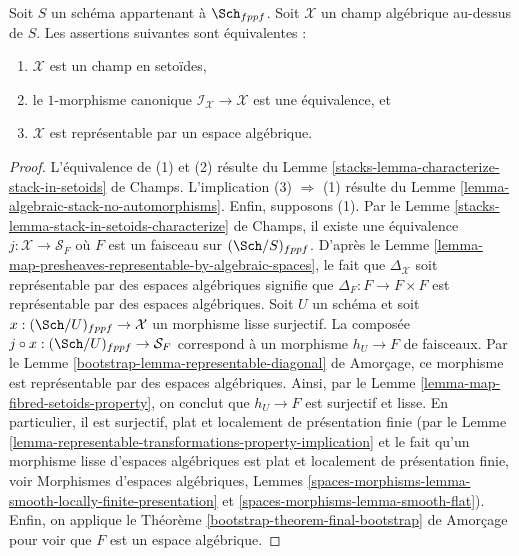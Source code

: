 \begin{proposition}
\label{proposition-algebraic-stack-no-automorphisms}
Soit $S$ un schéma appartenant à $\Sch_{fppf}$.
Soit $\mathcal{X}$ un champ algébrique au-dessus de $S$.
Les assertions suivantes sont équivalentes :
\begin{enumerate}
\item $\mathcal{X}$ est un champ en setoïdes,
\item le $1$-morphisme canonique $\mathcal{I}_\mathcal{X} \to \mathcal{X}$
est une équivalence, et
\item $\mathcal{X}$ est représentable par un espace algébrique.
\end{enumerate}
\end{proposition}

\begin{proof}
L'équivalence de (1) et (2) résulte du
Lemme \ref{stacks-lemma-characterize-stack-in-setoids} de Champs.
L'implication (3) $\Rightarrow$ (1) résulte du
Lemme \ref{lemma-algebraic-stack-no-automorphisms}.
Enfin, supposons (1). Par le
Lemme \ref{stacks-lemma-stack-in-setoids-characterize} de Champs,
il existe une équivalence $j : \mathcal{X} \to \mathcal{S}_F$
où $F$ est un faisceau sur $(\Sch/S)_{fppf}$.  D'après le
Lemme \ref{lemma-map-presheaves-representable-by-algebraic-spaces},
le fait que $\Delta_\mathcal{X}$ soit représentable par des espaces
algébriques signifie que $\Delta_F : F \to F \times F$
est représentable par des espaces algébriques.
Soit $U$ un schéma et soit $x : (\Sch/U)_{fppf} \to \mathcal{X}$
un morphisme lisse surjectif. La composée
$j \circ x : (\Sch/U)_{fppf} \to \mathcal{S}_F$
correspond à un morphisme $h_U \to F$ de faisceaux. Par le
Lemme \ref{bootstrap-lemma-representable-diagonal} de Amorçage,
ce morphisme est représentable par des espaces algébriques.
Ainsi, par le
Lemme \ref{lemma-map-fibred-setoids-property},
on conclut que $h_U \to F$ est surjectif et lisse.
En particulier, il est surjectif, plat et localement de présentation finie
(par le
Lemme \ref{lemma-representable-transformations-property-implication}
et le fait qu'un morphisme lisse d'espaces algébriques est plat et
localement de présentation finie, voir
Morphismes d'espaces algébriques,
Lemmes \ref{spaces-morphisms-lemma-smooth-locally-finite-presentation} et
\ref{spaces-morphisms-lemma-smooth-flat}).
Enfin, on applique le
Théorème \ref{bootstrap-theorem-final-bootstrap} de Amorçage
pour voir que $F$ est un espace algébrique.
\end{proof}







